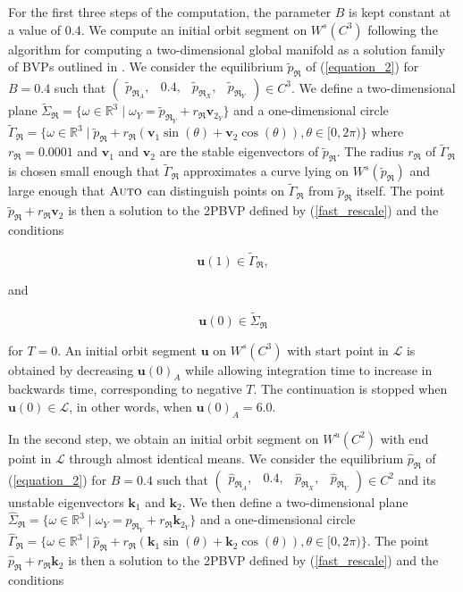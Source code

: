 \documentclass{ws-ijbc}
\begin{document}
For the first three steps of the computation, the parameter $B$ is kept constant at a value of $0.4$.  We compute an initial orbit segment on $W^{s}(C^3)$ following the algorithm for computing a two-dimensional global manifold as a solution family of BVPs outlined in \cite{Red_book}.  We consider the equilibrium $\tilde{p}_{\Re}$ of (\ref{equation_2}) for $B=0.4$ such that $\begin{pmatrix} \tilde{p}_{\Re_A},& 0.4,&\tilde{p}_{\Re_X},&\tilde{p}_{\Re_Y} \end{pmatrix} \in C^3$.  We define a two-dimensional plane $\widetilde{\Sigma}_{\Re} = \{ \omega \in \mathbb{R}^3  \; | \; \omega_Y = \tilde{p}_{\Re_Y} + r_{\Re}\mathbf{v}_{2_Y} \}$ and a one-dimensional circle $\widetilde{\Gamma}_{\Re}= \{ \omega \in \mathbb{R}^3  \; | \; \tilde{p}_{\Re} + r_{\Re}(\mathbf{v}_1\sin(\theta) + \mathbf{v}_2\cos(\theta)), \theta \in [0,2\pi) \}$  where $r_{\Re}=0.0001$ and $\mathbf{v}_1$ and $\mathbf{v}_2$ are the stable eigenvectors of $\tilde{p}_{\Re}$.  The radius $r_{\Re}$ of $\widetilde{\Gamma}_{\Re}$ is chosen small enough that $\widetilde{\Gamma}_{\Re}$ approximates a curve lying on $W^{s}(\tilde{p}_{\Re})$ and large enough that $\textsc{Auto}$ can distinguish points on $\widetilde{\Gamma}_{\Re}$ from $\tilde{p}_{\Re}$ itself.  The point $\tilde{p}_{\Re} + r_{\Re}\mathbf{v}_2$ is then a solution to the 2PBVP defined by (\ref{fast_rescale}) and the conditions

\begin{equation}
	\mathbf{u}(1) \in \widetilde{\Gamma}_{\Re},
	\label{top_end}
\end{equation}

and

\begin{equation}
	\mathbf{u}(0) \in \widetilde{\Sigma}_{\Re}
\end{equation}

\noindent
for $T=0$.  An initial orbit segment $\mathbf{u}$ on $W^{s}(C^3)$ with start point in $\mathscr{L}$ is obtained by decreasing $\mathbf{u}(0)_A$ while allowing integration time to increase in backwards time, corresponding to negative $T$.  The continuation is stopped when $\mathbf{u}(0) \in \mathscr{L}$, in other words, when $\mathbf{u}(0)_A = 6.0$.

In the second step, we obtain an initial orbit segment on $W^{u}(C^2)$ with end point in $\mathscr{L}$ through almost identical means.  We consider the equilibrium $\hat{p}_{\Re}$ of (\ref{equation_2}) for $B=0.4$ such that $\begin{pmatrix} \hat{p}_{\Re_A}, &0.4, & \hat{p}_{\Re_X}, & \hat{p}_{\Re_Y} \end{pmatrix} \in C^2$ and its unstable eigenvectors $\mathbf{k}_1$ and $\mathbf{k}_2$.  We then define a two-dimensional plane $\widehat{\Sigma}_{\Re} = \{ \omega \in \mathbb{R}^3 \; | \; \omega_Y = \hat{p}_{\Re_Y} + r_{\Re}\mathbf{k}_{2_Y}\}$ and a one-dimensional circle $\widehat{\Gamma}_{\Re} = \{ \omega \in \mathbb{R}^3  \; | \; \hat{p}_{\Re} + r_{\Re}(\mathbf{k}_1\sin(\theta) + \mathbf{k}_2\cos(\theta)), \theta \in [0,2\pi) \}$.  The point $\hat{p}_{\Re} + r_{\Re}\mathbf{k}_2$ is then a solution to the 2PBVP defined by (\ref{fast_rescale}) and the conditions
\end{document}
